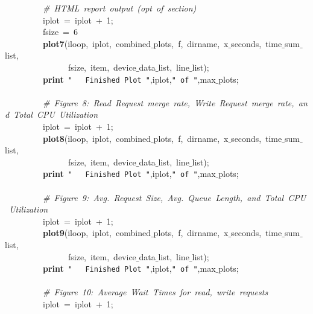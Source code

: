 \mbox{}\ \ \ \ \ \ \ \ \ \textit{\#\ HTML\ report\ output\ (opt\ of\ section)} \\
\mbox{}\ \ \ \ \ \ \ \ \ iplot\ =\ iplot\ +\ 1; \\
\mbox{}\ \ \ \ \ \ \ \ \ fsize\ =\ 6 \\
\mbox{}\ \ \ \ \ \ \ \ \ \textbf{plot7}(iloop,\ iplot,\ combined$\_$plots,\ f,\ dirname,\ x$\_$seconds,\ time$\_$sum$\_$list, \\
\mbox{}\ \ \ \ \ \ \ \ \ \ \ \ \ \ \ fsize,\ item,\ device$\_$data$\_$list,\ line$\_$list); \\
\mbox{}\ \ \ \ \ \ \ \ \ \textbf{print}\ \texttt{"{}\ \ \ Finished\ Plot\ "{}},iplot,\texttt{"{}\ of\ "{}},max$\_$plots; \\
\mbox{}\ \ \ \ \ \ \ \ \  \\
\mbox{}\ \ \ \ \ \ \ \ \ \textit{\#\ Figure\ 8:\ Read\ Request\ merge\ rate,\ Write\ Request\ merge\ rate,\ and\ Total\ CPU\ Utilization} \\
\mbox{}\ \ \ \ \ \ \ \ \ iplot\ =\ iplot\ +\ 1; \\
\mbox{}\ \ \ \ \ \ \ \ \ \textbf{plot8}(iloop,\ iplot,\ combined$\_$plots,\ f,\ dirname,\ x$\_$seconds,\ time$\_$sum$\_$list, \\
\mbox{}\ \ \ \ \ \ \ \ \ \ \ \ \ \ \ fsize,\ item,\ device$\_$data$\_$list,\ line$\_$list); \\
\mbox{}\ \ \ \ \ \ \ \ \ \textbf{print}\ \texttt{"{}\ \ \ Finished\ Plot\ "{}},iplot,\texttt{"{}\ of\ "{}},max$\_$plots; \\
\mbox{}\ \ \ \ \ \  \\
\mbox{}\ \ \ \ \ \ \ \ \ \textit{\#\ Figure\ 9:\ Avg.\ Request\ Size,\ Avg.\ Queue\ Length,\ and\ Total\ CPU\ Utilization} \\
\mbox{}\ \ \ \ \ \ \ \ \ iplot\ =\ iplot\ +\ 1; \\
\mbox{}\ \ \ \ \ \ \ \ \ \textbf{plot9}(iloop,\ iplot,\ combined$\_$plots,\ f,\ dirname,\ x$\_$seconds,\ time$\_$sum$\_$list, \\
\mbox{}\ \ \ \ \ \ \ \ \ \ \ \ \ \ \ fsize,\ item,\ device$\_$data$\_$list,\ line$\_$list); \\
\mbox{}\ \ \ \ \ \ \ \ \ \textbf{print}\ \texttt{"{}\ \ \ Finished\ Plot\ "{}},iplot,\texttt{"{}\ of\ "{}},max$\_$plots; \\
\mbox{}\ \ \ \ \ \  \\
\mbox{}\ \ \ \ \ \ \ \ \ \textit{\#\ Figure\ 10:\ Average\ Wait\ Times\ for\ read,\ write\ requests} \\
\mbox{}\ \ \ \ \ \ \ \ \ iplot\ =\ iplot\ +\ 1; \\
